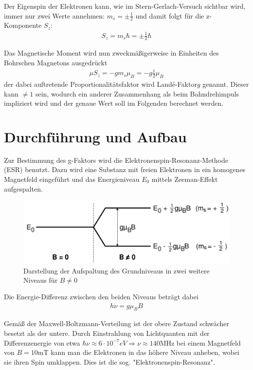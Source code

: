 Der Eigenspin der Elektronen kann, wie im Stern-Gerlach-Versuch sichtbar wird, immer nur zwei Werte annehmen: $m_s=\pm \frac{1}{2}$ und damit folgt für die z-Komponente $S_z$:
\begin{align*}
S_z=m_s\hbar=\pm\frac{1}{2}\hbar
\end{align*}

Das Magnetische Moment wird nun zweckmäßigerweise in Einheiten des Bohrschen Magnetons ausgedrückt
\begin{align*}
\mu S_z=-gm_s\mu_B=-g\frac{1}{2}\mu_B
\end{align*}
der dabei auftretende Proportionalitätsfaktor wird \glqq Landé-Faktor\grqq $g$  genannt. Dieser kann $\neq 1$ sein, wodurch ein anderer Zusammenhang als beim Bahndrehimpuls impliziert wird und der genaue Wert soll im Folgenden berechnet werden.
\section{Durchführung und Aufbau}
Zur Bestimmung des g-Faktors wird die Elektronenspin-Resonanz-Methode (ESR) benutzt. Dazu wird eine Substanz mit freien Elektronen in ein homogenes Magnetfeld eingeführt und das Energieniveau $E_0$ mittels Zeeman-Effekt aufgespalten.\\

\begin{figure}[H]
\includegraphics[scale=0.5]{../pics/aufsp.pdf}
\caption{Darstellung der Aufspaltung des Grundniveaus in zwei weitere Niveaus für $B\neq 0$\protect\footnotemark}
\label{pic_aufspaltung}
\end{figure}

Die Energie-Differenz zwischen den beiden Niveaus beträgt dabei
\begin{align}
h\nu = g \mu_B B
\label{eq_energie}
\end{align}

Gemäß der Maxwell-Boltzmann-Verteilung ist der obere Zustand schwächer besetzt als der untere. Durch Einstrahlung von Lichtquanten mit der Differenzenergie von etwa $\hbar\nu \approx 6\cdot10^{-7}eV \Rightarrow \nu \approx 140 \text{MHz}$ bei einem Magnetfeld von $B=10\text{mT}$ kann man die Elektronen in das höhere Niveau anheben, wobei sie ihren Spin umklappen. Dies ist die sog. "Elektronenspin-Resonanz".\\

